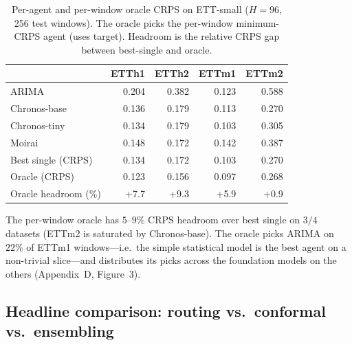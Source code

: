 \documentclass{article}
\begin{document}
\begin{table}[h]
  \centering
  \small
  \caption{Per-agent and per-window oracle CRPS on ETT-small ($H=96$, 256 test
    windows). The oracle picks the per-window minimum-CRPS agent (uses target).
    Headroom is the relative CRPS gap between best-single and oracle.}
  \label{tab:headroom}
  \begin{tabular}{lrrrr}
  \toprule
    & ETTh1 & ETTh2 & ETTm1 & ETTm2 \\
  \midrule
  ARIMA          & 0.204 & 0.382 & 0.123 & 0.588 \\
  Chronos-base   & 0.136 & 0.179 & 0.113 & 0.270 \\
  Chronos-tiny   & 0.134 & 0.179 & 0.103 & 0.305 \\
  Moirai         & 0.148 & 0.172 & 0.142 & 0.387 \\
  \midrule
  Best single (CRPS) & 0.134 & 0.172 & 0.103 & 0.270 \\
  Oracle (CRPS)      & 0.123 & 0.156 & 0.097 & 0.268 \\
  Oracle headroom (\%) & +7.7 & +9.3 & +5.9 & +0.9 \\
  \bottomrule
  \end{tabular}
\end{table}

The per-window oracle has $5$--$9\%$ CRPS headroom over best single
on $3/4$ datasets (ETTm2 is saturated by Chronos-base). The
oracle picks ARIMA on $22\%$ of ETTm1 windows---i.e.\ the simple
statistical model is the best agent on a non-trivial slice---and
distributes its picks across the foundation models on the others
(Appendix~D, Figure~3).

\subsection{Headline comparison: routing vs.\ conformal vs.\ ensembling}
\label{sec:comparison}
\end{document}
